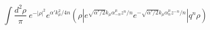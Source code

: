\begin{equation}
\int \frac{d^2\rho}{\pi}\ e^{-|\rho|^2} e^{\alpha' k_\mu^2/4n}(\rho|
e^{\sqrt{\alpha'/2}k_\mu \alpha_{-n}^\mu z^n/n}
e^{-\sqrt{\alpha'/2}k_\mu \alpha_{n}^\mu z^{-n}/n}|q^n\rho)
\end{equation}

